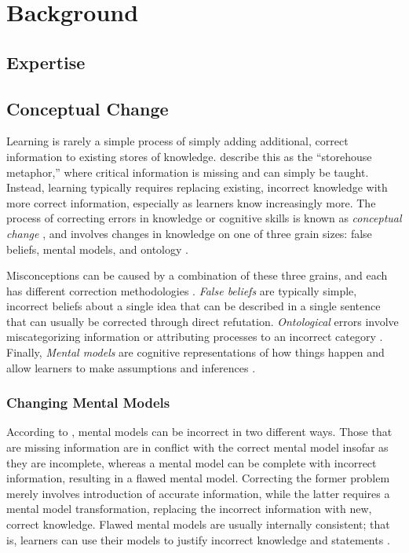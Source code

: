 
\chapter{Background}

\section{Expertise}

\section{Conceptual Change}

Learning is rarely a simple process of simply adding additional, correct information to existing stores of knowledge. \citet*{Klein2006} describe this as the ``storehouse metaphor,'' where critical information is missing and can simply be taught. Instead, learning typically requires replacing existing, incorrect knowledge with more correct information, especially as learners know increasingly more. The process of correcting errors in knowledge or cognitive skills is known as \emph{conceptual change} \citep{Chi2008}, and involves changes in knowledge on one of three grain sizes: false beliefs, mental models, and ontology \citep{Gadgil2012}.

Misconceptions can be caused by a combination of these three grains, and each has different correction methodologies \citep{Gadgil2012}. \emph{False beliefs} are typically simple, incorrect beliefs about a single idea that can be described in a single sentence that can usually be corrected through direct refutation. \emph{Ontological} errors involve miscategorizing information or attributing processes to an incorrect category \citep{Chi1994}. Finally, \emph{Mental models} are cognitive representations of how things happen \citep{Klein2006} and allow learners to make assumptions and inferences \citep{Gadgil2012}.

\subsection{Changing Mental Models}

According to \citet{Chi2008}, mental models can be incorrect in two different ways. Those that are missing information are in conflict with the correct mental model insofar as they are incomplete, whereas a mental model can be complete with incorrect information, resulting in a flawed mental model. Correcting the former problem merely involves introduction of accurate information, while the latter requires a mental model transformation, replacing the incorrect information with new, correct knowledge. Flawed mental models are usually internally consistent; that is, learners can use their models to justify incorrect knowledge and statements \citep{Vosniadou1994}.

